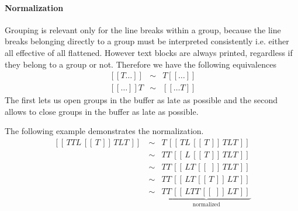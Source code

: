 \documentclass[12pt]{article}
\def\GS{\,[\![\,}
\def\GE{\,]\!]\,}
\def\group#1{\GS #1 \GE}
\begin{document}
\paragraph{Normalization}
Grouping is relevant only for the line breaks within a group, because the line
breaks belonging directly to a group must be interpreted consistently
i.e. either all effective of all flattened. However text blocks are always
printed, regardless if they belong to a group or not. Therefore we have the
following equivalences
$$
%
\begin{array}{lll}
  \ [\![T \ldots]\!] &\sim&  T [\![\ldots]\!]
  \\
  \ [\![\ldots]\!] T &\sim&  [\![\ldots T]\!]
\end{array}
$$
%
The first lets us open groups in the buffer as late as possible and the second
allows to close groups in the buffer as late as possible.

The following example demonstrates the normalization.
$$
\begin{array}{lll}
  \group {T T L \group{T} T L T}
  &\sim& T \group {T L \group{T} T L T}
  \\
  &\sim& T T \group{L \group{T} T L T}
  \\
  &\sim& T T \group{L T \group{} T L T}
  \\
  &\sim& T T \group{L T \group{T} L T}
  \\
  &\sim& \underbrace{T T \group{L T T \group{} L T}}_\text{normalized}
\end{array}
$$
\end{document}
